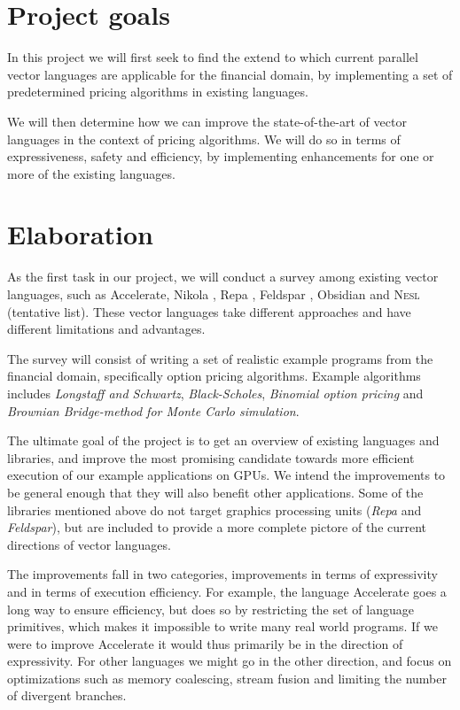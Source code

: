 \documentclass[10pt,a4paper,final,oneside,openany,article]{memoir}
\begin{document}
\chapter{Project goals}
In this project we will first seek to find the extend to which
current parallel vector languages are applicable for the financial
domain, by implementing a set of predetermined pricing algorithms in
existing languages.

We will then determine how we can improve the state-of-the-art of
vector languages in the context of pricing algorithms. We will do so
in terms of expressiveness, safety and efficiency, by implementing
enhancements for one or more of the existing languages.

\chapter{Elaboration}


As the first task in our project, we will conduct a survey among
existing vector languages, such as
Accelerate\cite{chakravarty2011accelerating}, Nikola
\cite{mainland2010nikola}, Repa \cite{keller2010regular}, Feldspar
\cite{axelsson2010feldspar}, Obsidian and \textsc{Nesl} (tentative
list). These vector languages take different approaches and have
different limitations and advantages.

The survey will consist of writing a set of realistic example programs
from the financial domain, specifically option pricing
algorithms. Example algorithms includes \textit{Longstaff and
  Schwartz}, \textit{Black-Scholes}, \textit{Binomial option pricing}
and \textit{Brownian Bridge-method for Monte Carlo simulation}.

The ultimate goal of the project is to get an overview of existing
languages and libraries, and improve the most promising candidate
towards more efficient execution of our example applications on
GPUs. We intend the improvements to be general enough that they will
also benefit other applications. Some of the libraries mentioned above
do not target graphics processing units (\textit{Repa} and
\textit{Feldspar}), but are included to provide a more complete
pictore of the current directions of vector languages.

The improvements fall in two categories, improvements in terms of
expressivity and in terms of execution efficiency. For example, the
language Accelerate goes a long way to ensure efficiency, but does so
by restricting the set of language primitives, which makes it
impossible to write many real world programs. If we were to improve
Accelerate it would thus primarily be in the direction of
expressivity. For other languages we might go in the other direction,
and focus on optimizations such as memory coalescing, stream fusion
and limiting the number of divergent branches.
\end{document}
